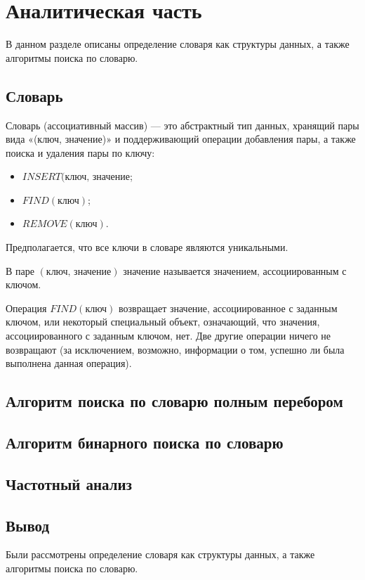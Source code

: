 \documentclass[12pt]{report}
\begin{document}
\chapter{Аналитическая часть}
В данном разделе описаны определение словаря как структуры данных, а также алгоритмы поиска по словарю.

\section{Словарь}
Словарь (ассоциативный массив)\cite{NIST} — это абстрактный тип данных, хранящий пары вида «(ключ, значение)» и поддерживающий операции добавления пары, а также поиска и удаления пары по ключу:
\begin{itemize}
\item $INSERT(\textit{ключ, значение}$;
\item $FIND(\textit{ключ})$;
\item $REMOVE(\textit{ключ})$.
\end{itemize}

Предполагается, что все ключи в словаре являются уникальными.

В паре $(\textit{ключ, значение})$ $\textit{значение}$ называется значением, ассоциированным с ключом.

Операция $FIND(\textit{ключ})$ возвращает значение, ассоциированное с заданным ключом, или некоторый специальный объект, означающий, что значения, ассоциированного с заданным ключом, нет. Две другие операции ничего не возвращают (за исключением, возможно, информации о том, успешно ли была выполнена данная операция).

\section{Алгоритм поиска по словарю полным перебором}


\section{Алгоритм бинарного поиска по словарю}

\section{Частотный анализ}

\section*{Вывод}
Были рассмотрены определение словаря как структуры данных, а также алгоритмы поиска по словарю.
\end{document}
